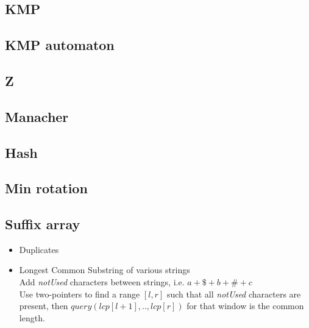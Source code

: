 
\subsection{KMP }

\subsection{KMP automaton }

\subsection{Z }

\subsection{Manacher }

\subsection{Hash }

\subsection{Min rotation }

\subsection{Suffix array }

\begin{itemize}[noitemsep]
  \item Duplicates 

  \item Longest Common Substring of various strings \\
  Add \emph{notUsed} characters between strings, i.e. $a + \$ + b + \# + c$ \\ 
  Use two-pointers to find a range $[l, r]$ such that all \emph{notUsed} characters are present, then $query(lcp[l + 1],..,lcp[r])$ for that window is the common length. \\

\end{itemize}

